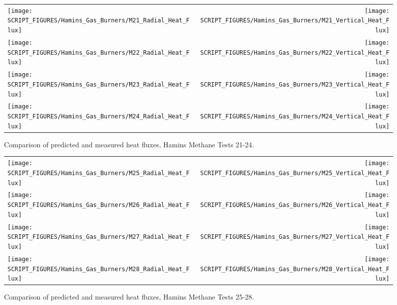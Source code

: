 \begin{figure}[p]
\begin{tabular*}{\textwidth}{l@{\extracolsep{\fill}}r}
\texttt{[image: SCRIPT\_FIGURES/Hamins\_Gas\_Burners/M21\_Radial\_Heat\_Flux]} &
\texttt{[image: SCRIPT\_FIGURES/Hamins\_Gas\_Burners/M21\_Vertical\_Heat\_Flux]} \\
\texttt{[image: SCRIPT\_FIGURES/Hamins\_Gas\_Burners/M22\_Radial\_Heat\_Flux]} &
\texttt{[image: SCRIPT\_FIGURES/Hamins\_Gas\_Burners/M22\_Vertical\_Heat\_Flux]} \\
\texttt{[image: SCRIPT\_FIGURES/Hamins\_Gas\_Burners/M23\_Radial\_Heat\_Flux]} &
\texttt{[image: SCRIPT\_FIGURES/Hamins\_Gas\_Burners/M23\_Vertical\_Heat\_Flux]} \\
\texttt{[image: SCRIPT\_FIGURES/Hamins\_Gas\_Burners/M24\_Radial\_Heat\_Flux]} &
\texttt{[image: SCRIPT\_FIGURES/Hamins\_Gas\_Burners/M24\_Vertical\_Heat\_Flux]}
\end{tabular*}
\label{Hamins_Methane_21-24}
\caption[Heat flux predictions, Hamins methane burner Tests 21-24]
{Comparison of predicted and measured heat fluxes, Hamins Methane Tests 21-24.}
\end{figure}

\begin{figure}[p]
\begin{tabular*}{\textwidth}{l@{\extracolsep{\fill}}r}
\texttt{[image: SCRIPT\_FIGURES/Hamins\_Gas\_Burners/M25\_Radial\_Heat\_Flux]} &
\texttt{[image: SCRIPT\_FIGURES/Hamins\_Gas\_Burners/M25\_Vertical\_Heat\_Flux]} \\
\texttt{[image: SCRIPT\_FIGURES/Hamins\_Gas\_Burners/M26\_Radial\_Heat\_Flux]} &
\texttt{[image: SCRIPT\_FIGURES/Hamins\_Gas\_Burners/M26\_Vertical\_Heat\_Flux]} \\
\texttt{[image: SCRIPT\_FIGURES/Hamins\_Gas\_Burners/M27\_Radial\_Heat\_Flux]} &
\texttt{[image: SCRIPT\_FIGURES/Hamins\_Gas\_Burners/M27\_Vertical\_Heat\_Flux]} \\
\texttt{[image: SCRIPT\_FIGURES/Hamins\_Gas\_Burners/M28\_Radial\_Heat\_Flux]} &
\texttt{[image: SCRIPT\_FIGURES/Hamins\_Gas\_Burners/M28\_Vertical\_Heat\_Flux]}
\end{tabular*}
\label{Hamins_Methane_25-28}
\caption[Heat flux predictions, Hamins methane burner Tests 25-28]
{Comparison of predicted and measured heat fluxes, Hamins Methane Tests 25-28.}
\end{figure}

